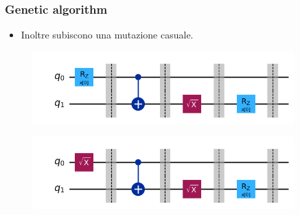 \documentclass{beamer}
\begin{document}
\begin{frame}
  \frametitle{Genetic algorithm}
  \begin{itemize}
    \item Inoltre subiscono una mutazione casuale.  
  \end{itemize}

  \begin{figure}
    \includegraphics[width=0.9\textwidth]{images/nonmutated.png}
  \end{figure} 
  \begin{figure}
    \includegraphics[width=0.9\textwidth]{images/mutated.png}
  \end{figure} 
\end{frame}
\end{document}
